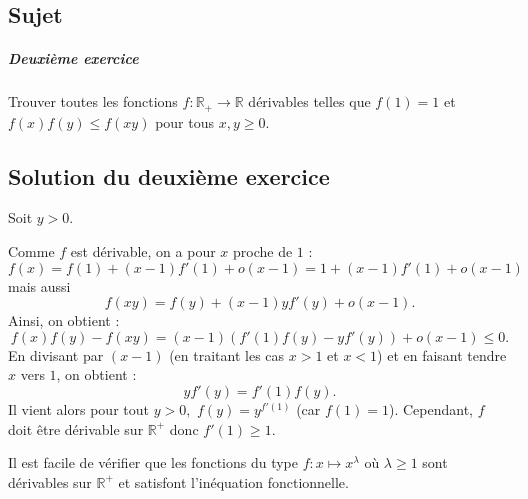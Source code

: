\chapter{}

\section{Sujet}

\paragraph{Deuxième exercice}

Trouver toutes les fonctions $f : \mathbb R_+ \to \mathbb R$ dérivables telles que $f(1)=1$ et $f(x)f(y) \leq f(xy)$ pour tous $x,y \geqslant 0$.


\section{Solution du deuxième exercice}

Soit $y>0.$

Comme $f$ est dérivable, on a pour $x$ proche de $1$ : 
$$f(x)=f(1)+(x-1)f'(1)+o(x-1)=1+(x-1)f'(1)+o(x-1)$$ mais aussi $$ f(xy)=f(y)+(x-1)yf'(y)+o(x-1).$$
Ainsi, on obtient : $$f(x)f(y)-f(xy)=(x-1)\left( f'(1)f(y)-yf'(y) \right)+o(x-1)\leq 0.$$
En divisant par $(x-1)$ (en traitant les cas $x>1$ et $x<1$) et en faisant tendre $x$ vers $1$, on obtient : $$yf'(y)=f'(1)f(y).$$
Il vient alors pour tout $y>0,$ $\displaystyle f(y)=y^{f'(1)}$ (car $f(1)=1$).
Cependant, $f$ doit être dérivable sur $\mathbb{R}^{+}$ donc $f'(1)\geq 1.$

Il est facile de vérifier que les fonctions du type $ f: x\mapsto x^{\lambda}$ où $\lambda\geq 1$ sont dérivables sur $\mathbb{R}^{+}$ et satisfont l'inéquation fonctionnelle.